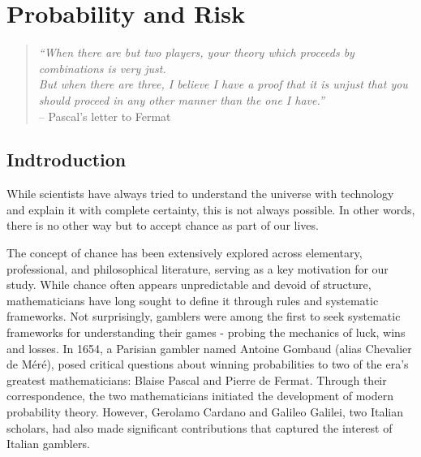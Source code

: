 


\chapter{Probability and Risk~\label{ch:probandacc}}


\begin{verse}{\it
``When there are but two players, your theory which proceeds by combinations is very just. \\
But when there are three, I believe I have a proof that it is unjust that you should proceed in any other manner than the one I have.''\vspace*{6pt}} \\
\hspace*{2cm} -- Pascal's letter to Fermat
\end{verse}
\vspace*{12pt}


\section{Indtroduction~\label{sec:intro}}

While scientists have always tried to understand the universe with technology and explain it with complete certainty, this is not always possible.
In other words, there is no other way but to accept chance as part of our lives.

The concept of chance has been extensively explored across elementary, professional, and philosophical literature, serving as a key motivation for our study.
While chance often appears unpredictable and devoid of structure, mathematicians have long sought to define it through rules and systematic frameworks.
Not surprisingly, gamblers were among the first to seek systematic frameworks for understanding their games - probing the mechanics of luck, wins and losses.
In 1654, a Parisian gambler named Antoine Gombaud (alias Chevalier de Méré), posed critical questions about winning probabilities to two of the era’s greatest mathematicians: Blaise Pascal and Pierre de Fermat.
Through their correspondence, the two mathematicians initiated the development of modern probability theory.
However, Gerolamo Cardano and Galileo Galilei, two Italian scholars, had also made significant contributions that captured the interest of Italian gamblers.

